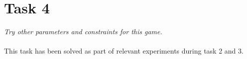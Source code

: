 \section{Task 4}
\label{sec:task4}
\textit{Try other parameters and constraints for this game.}\\\\
This task has been solved as part of relevant experiments during task 2 and 3.